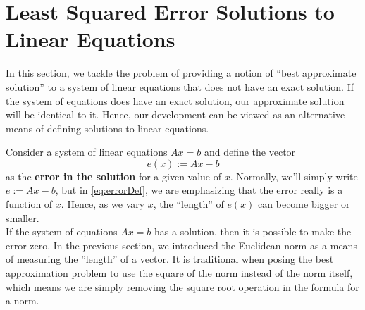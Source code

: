 
\section{Least Squared Error Solutions to Linear Equations}
\label{sec:LeastSqauresGeneral}

In this section, we tackle the problem of providing a notion of ``best approximate solution'' to a system of linear equations that does not have an exact solution. If the system of equations does have an exact solution, our approximate solution will be identical to it. Hence, our development can be viewed as an alternative means of defining solutions to linear equations. 

Consider a system of linear equations $Ax=b$ and define the vector
\begin{equation}
\label{eq:errorDef}
    e(x):=Ax-b
\end{equation}
as the \textbf{error in the solution} for a given value of $x$. Normally, we'll simply write $e:=Ax-b$, but in \eqref{eq:errorDef}, we are emphasizing that the error really is a function of $x$. Hence, as we vary $x$, the ``length'' of $e(x)$ can become bigger or smaller. \\

If the system of equations $Ax=b$ has a solution, then it is possible to make the error zero. In the previous section, we introduced the Euclidean norm as a means of measuring the ''length'' of a vector. It is traditional when posing the best approximation problem to use the square of the norm instead of the norm itself, which means we are simply removing the square root operation in the formula for a norm.

